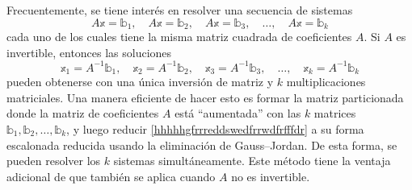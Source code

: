 Frecuentemente, se tiene interés en resolver una secuencia de sistemas
$$A\mathbb{x} = \mathbb{b}_1, \quad A\mathbb{x} = \mathbb{b}_2, \quad A\mathbb{x} = \mathbb{b}_3, \quad \dots, \quad A\mathbb{x} = \mathbb{b}_k$$
cada uno de los cuales tiene la misma matriz cuadrada de coeficientes $A$. Si $A$ es invertible, entonces las soluciones
$$\mathbb{x}_1 = A^{-1} \mathbb{b}_1, \quad \mathbb{x}_2 = A^{-1} \mathbb{b}_2, \quad \mathbb{x}_3 = A^{-1} \mathbb{b}_3, \quad \dots, \quad \mathbb{x}_k = A^{-1} \mathbb{b}_k$$
pueden obtenerse con una única inversión de matriz y $k$ multiplicaciones matriciales. Una manera eficiente de hacer esto es formar la matriz particionada
\begin{equation}
    [A \mid \mathbb{b}_1 \mid \mathbb{b}_2 \mid \cdots \mid \mathbb{b}_k] \label{hhhhhgfrrreddswedfrrwdfrfffdr}
\end{equation}
donde la matriz de coeficientes $A$ está “aumentada” con las $k$ matrices $\mathbb{b}_1, \mathbb{b}_2, \dots, \mathbb{b}_k$, y luego reducir \eqref{hhhhhgfrrreddswedfrrwdfrfffdr} a su forma escalonada reducida usando la eliminación de Gauss–Jordan. De esta forma, se pueden resolver los $k$ sistemas simultáneamente. Este método tiene la ventaja adicional de que también se aplica cuando $A$ no es invertible.

